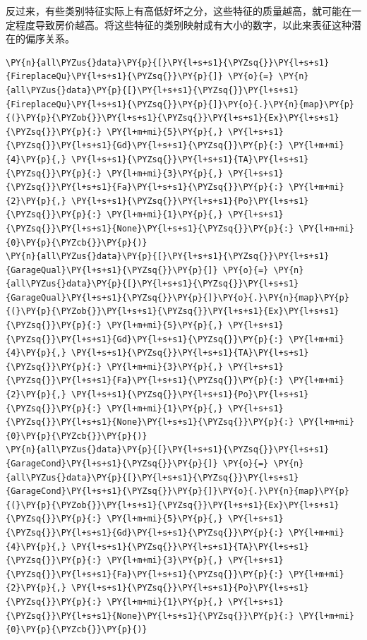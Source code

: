 \documentclass[no-math]{YangThesis}
\begin{document}
反过来，有些类别特征实际上有高低好坏之分，这些特征的质量越高，就可能在一定程度导致房价越高。将这些特征的类别映射成有大小的数字，以此来表征这种潜在的偏序关系。

\begin{tcolorbox}[breakable, size=fbox, boxrule=1pt, pad at break*=1mm,colback=cellbackground, colframe=cellborder]
	\begin{Verbatim}[commandchars=\\\{\}]
\PY{n}{all\PYZus{}data}\PY{p}{[}\PY{l+s+s1}{\PYZsq{}}\PY{l+s+s1}{FireplaceQu}\PY{l+s+s1}{\PYZsq{}}\PY{p}{]} \PY{o}{=} \PY{n}{all\PYZus{}data}\PY{p}{[}\PY{l+s+s1}{\PYZsq{}}\PY{l+s+s1}{FireplaceQu}\PY{l+s+s1}{\PYZsq{}}\PY{p}{]}\PY{o}{.}\PY{n}{map}\PY{p}{(}\PY{p}{\PYZob{}}\PY{l+s+s1}{\PYZsq{}}\PY{l+s+s1}{Ex}\PY{l+s+s1}{\PYZsq{}}\PY{p}{:} \PY{l+m+mi}{5}\PY{p}{,} \PY{l+s+s1}{\PYZsq{}}\PY{l+s+s1}{Gd}\PY{l+s+s1}{\PYZsq{}}\PY{p}{:} \PY{l+m+mi}{4}\PY{p}{,} \PY{l+s+s1}{\PYZsq{}}\PY{l+s+s1}{TA}\PY{l+s+s1}{\PYZsq{}}\PY{p}{:} \PY{l+m+mi}{3}\PY{p}{,} \PY{l+s+s1}{\PYZsq{}}\PY{l+s+s1}{Fa}\PY{l+s+s1}{\PYZsq{}}\PY{p}{:} \PY{l+m+mi}{2}\PY{p}{,} \PY{l+s+s1}{\PYZsq{}}\PY{l+s+s1}{Po}\PY{l+s+s1}{\PYZsq{}}\PY{p}{:} \PY{l+m+mi}{1}\PY{p}{,} \PY{l+s+s1}{\PYZsq{}}\PY{l+s+s1}{None}\PY{l+s+s1}{\PYZsq{}}\PY{p}{:} \PY{l+m+mi}{0}\PY{p}{\PYZcb{}}\PY{p}{)}
\PY{n}{all\PYZus{}data}\PY{p}{[}\PY{l+s+s1}{\PYZsq{}}\PY{l+s+s1}{GarageQual}\PY{l+s+s1}{\PYZsq{}}\PY{p}{]} \PY{o}{=} \PY{n}{all\PYZus{}data}\PY{p}{[}\PY{l+s+s1}{\PYZsq{}}\PY{l+s+s1}{GarageQual}\PY{l+s+s1}{\PYZsq{}}\PY{p}{]}\PY{o}{.}\PY{n}{map}\PY{p}{(}\PY{p}{\PYZob{}}\PY{l+s+s1}{\PYZsq{}}\PY{l+s+s1}{Ex}\PY{l+s+s1}{\PYZsq{}}\PY{p}{:} \PY{l+m+mi}{5}\PY{p}{,} \PY{l+s+s1}{\PYZsq{}}\PY{l+s+s1}{Gd}\PY{l+s+s1}{\PYZsq{}}\PY{p}{:} \PY{l+m+mi}{4}\PY{p}{,} \PY{l+s+s1}{\PYZsq{}}\PY{l+s+s1}{TA}\PY{l+s+s1}{\PYZsq{}}\PY{p}{:} \PY{l+m+mi}{3}\PY{p}{,} \PY{l+s+s1}{\PYZsq{}}\PY{l+s+s1}{Fa}\PY{l+s+s1}{\PYZsq{}}\PY{p}{:} \PY{l+m+mi}{2}\PY{p}{,} \PY{l+s+s1}{\PYZsq{}}\PY{l+s+s1}{Po}\PY{l+s+s1}{\PYZsq{}}\PY{p}{:} \PY{l+m+mi}{1}\PY{p}{,} \PY{l+s+s1}{\PYZsq{}}\PY{l+s+s1}{None}\PY{l+s+s1}{\PYZsq{}}\PY{p}{:} \PY{l+m+mi}{0}\PY{p}{\PYZcb{}}\PY{p}{)}
\PY{n}{all\PYZus{}data}\PY{p}{[}\PY{l+s+s1}{\PYZsq{}}\PY{l+s+s1}{GarageCond}\PY{l+s+s1}{\PYZsq{}}\PY{p}{]} \PY{o}{=} \PY{n}{all\PYZus{}data}\PY{p}{[}\PY{l+s+s1}{\PYZsq{}}\PY{l+s+s1}{GarageCond}\PY{l+s+s1}{\PYZsq{}}\PY{p}{]}\PY{o}{.}\PY{n}{map}\PY{p}{(}\PY{p}{\PYZob{}}\PY{l+s+s1}{\PYZsq{}}\PY{l+s+s1}{Ex}\PY{l+s+s1}{\PYZsq{}}\PY{p}{:} \PY{l+m+mi}{5}\PY{p}{,} \PY{l+s+s1}{\PYZsq{}}\PY{l+s+s1}{Gd}\PY{l+s+s1}{\PYZsq{}}\PY{p}{:} \PY{l+m+mi}{4}\PY{p}{,} \PY{l+s+s1}{\PYZsq{}}\PY{l+s+s1}{TA}\PY{l+s+s1}{\PYZsq{}}\PY{p}{:} \PY{l+m+mi}{3}\PY{p}{,} \PY{l+s+s1}{\PYZsq{}}\PY{l+s+s1}{Fa}\PY{l+s+s1}{\PYZsq{}}\PY{p}{:} \PY{l+m+mi}{2}\PY{p}{,} \PY{l+s+s1}{\PYZsq{}}\PY{l+s+s1}{Po}\PY{l+s+s1}{\PYZsq{}}\PY{p}{:} \PY{l+m+mi}{1}\PY{p}{,} \PY{l+s+s1}{\PYZsq{}}\PY{l+s+s1}{None}\PY{l+s+s1}{\PYZsq{}}\PY{p}{:} \PY{l+m+mi}{0}\PY{p}{\PYZcb{}}\PY{p}{)}

\end{Verbatim}
\end{tcolorbox}
\end{document}
